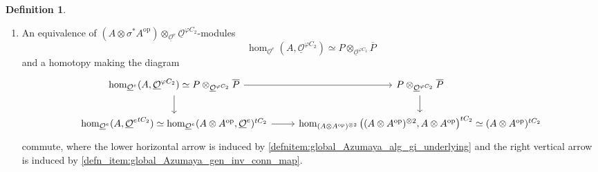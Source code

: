 \documentclass{article}
\newcommand{\op}{\mathrm{op}} %
\theoremstyle{definition}
\newtheorem{definition}[equation]{Definition}
\begin{document}
\begin{definition}
\begin{enumerate}[label=(\alph*)]
        \item \label{defn_item:global_Azumaya_gen_inv_geom_fixpt} An equivalence of $ \left(A \otimes \sigma^* A^\op\right) \otimes_{\underline{\mathcal{O}}^e} \underline{\mathcal{O}}^{\varphi C_2} $-modules 
        \begin{equation*}
            \hom_{\underline{\mathcal{O}}^e}(A, \underline{\mathcal{O}}^{\varphi C_2}) \simeq P \otimes_{\underline{\mathcal{O}}^{\varphi C_2}} \overline{P}
        \end{equation*}
        and a homotopy making the diagram 
        \begin{equation*}
        \begin{tikzcd}
            \hom_{\underline{\mathcal{O}}^e}(A, \underline{\mathcal{O}}^{\varphi C_2}) \simeq P \otimes_{\underline{\mathcal{O}}^{\varphi C_2}} \overline{P} \ar[r] \ar[d] & P \otimes_{\underline{\mathcal{O}}^{\varphi C_2}} \overline{P} \ar[d] \\
            \hom_{\underline{\mathcal{O}}^e}(A, {\underline{\mathcal{O}}^e}^{tC_2}) \simeq \hom_{\underline{\mathcal{O}}^e}(A \otimes A^\op, \underline{\mathcal{O}}^e)^{tC_2} \ar[r] & \hom_{(A \otimes A^\op)^{\otimes 2}}\left((A \otimes A^\op)^{\otimes 2}, A \otimes A^\op\right)^{tC_2} \simeq (A \otimes A^\op)^{tC_2}
        \end{tikzcd}    
        \end{equation*}
        commute, where the lower horizontal arrow is induced by \ref{defnitem:global_Azumaya_alg_gi_underlying} and the right vertical arrow is induced by \ref{defn_item:global_Azumaya_gen_inv_conn_map}. 
    \end{enumerate}
\end{definition}
\end{document}
